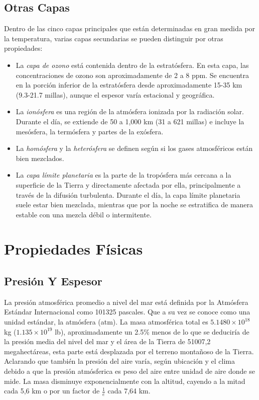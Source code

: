 \documentclass[12pt]{article}
\begin{document}
\subsection{Otras Capas}
Dentro de las cinco capas principales que están determinadas en gran medida por la temperatura, varias capas secundarias se pueden distinguir por otras propiedades:\\
\begin{itemize}
\item La \textit{capa de ozono} está contenida dentro de la estratósfera. En esta capa, las concentraciones de ozono son aproximadamente de 2 a 8 ppm. Se encuentra en la porción inferior de la estratósfera desde aproximadamente 15-35 km (9.3-21.7 millas), aunque el espesor varía estacional y geográfica. \\
\item La \textit{ionósfera} es una región de la atmósfera ionizada por la radiación solar. Durante el día, se extiende de 50 a 1,000 km (31 a 621 millas) e incluye la mesósfera, la termósfera y partes de la exósfera.\\
\item La \textit{homósfera} y la \textit{heterósfera} se definen según si los gases atmosféricos están bien mezclados.\\
\item La \textit{capa límite planetaria} es la parte de la tropósfera más cercana a la superficie de la Tierra y directamente afectada por ella, principalmente a través de la difusión turbulenta. Durante el día, la capa límite planetaria suele estar bien mezclada, mientras que por la noche se estratifica de manera estable con una mezcla débil o intermitente.
\end{itemize}


\section{Propiedades Físicas}

\subsection{Presión Y Espesor}
La presión atmosférica promedio a nivel del mar está definida por la Atmósfera Estándar Internacional como 101325 pascales. Que a su vez se conoce como una unidad estándar, la atmósfera (atm). La masa atmosférica total es $5.1480 \times 10 ^{18}$ kg ($1.135 \times10 ^{19}$ lb), aproximadamente un 2.5\% menos de lo que se deduciría de la presión media del nivel del mar y el área de la Tierra de 51007,2 megahectáreas, esta parte está desplazada por el terreno montañoso de la Tierra. Aclarando que también la presión del aire varía, según ubicación y el clima debido a que la presión atmósferica es peso del aire entre unidad de aire donde se mide. La masa disminuye exponencialmente con la altitud, cayendo a la mitad cada 5,6 km  o por un factor de $\frac{1}{e}$ cada 7,64 km. 
\end{document}
